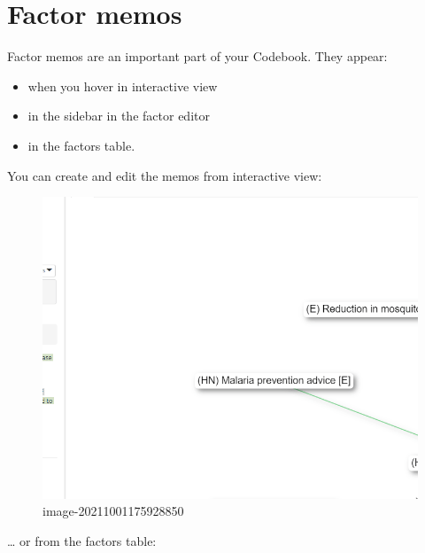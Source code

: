 \documentclass[
]{book}
\providecommand{\tightlist}{%
  \setlength{\itemsep}{0pt}\setlength{\parskip}{0pt}}
\begin{document}
\hypertarget{xfactormemos}{%
\section{Factor memos}\label{xfactormemos}}

Factor memos are an important part of your Codebook. They appear:

\begin{itemize}
\tightlist
\item
  when you hover in interactive view
\item
  in the sidebar in the factor editor
\item
  in the factors table.
\end{itemize}

You can create and edit the memos from interactive view:

\begin{figure}
\centering
\includegraphics[width=6.77083in,height=\textheight]{_assets/edit.gif}
\caption{image-20211001175928850}
\end{figure}

\ldots{} or from the factors table:
\end{document}
